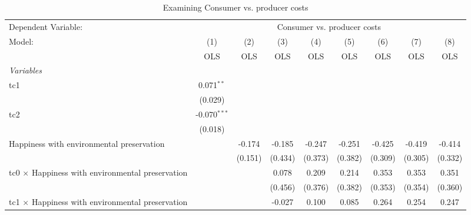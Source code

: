 
\begin{table}[htbp]
   \caption{Examining Consumer vs. producer costs}
   \centering
   \begin{tabular}{lcccccccc}
      \toprule
      Dependent Variable: & \multicolumn{8}{c}{Consumer vs. producer costs}\\
      Model:                                                  & (1)            & (2)     & (3)     & (4)         & (5)         & (6)          & (7)         & (8)\\  
                                                              &  OLS           & OLS     & OLS     & OLS         & OLS         & OLS          & OLS         & OLS\\  
      \midrule
      \emph{Variables}\\
      tc1                                                     & 0.071$^{**}$   &         &         &             &             &              &             &   \\   
                                                              & (0.029)        &         &         &             &             &              &             &   \\   
      tc2                                                     & -0.070$^{***}$ &         &         &             &             &              &             &   \\   
                                                              & (0.018)        &         &         &             &             &              &             &   \\   
      Happiness with environmental preservation               &                & -0.174  & -0.185  & -0.247      & -0.251      & -0.425       & -0.419      & -0.414\\   
                                                              &                & (0.151) & (0.434) & (0.373)     & (0.382)     & (0.309)      & (0.305)     & (0.332)\\   
      tc0 $\times$ Happiness with environmental preservation  &                &         & 0.078   & 0.209       & 0.214       & 0.353        & 0.353       & 0.351\\   
                                                              &                &         & (0.456) & (0.376)     & (0.382)     & (0.353)      & (0.354)     & (0.360)\\   
      tc1 $\times$ Happiness with environmental preservation  &                &         & -0.027  & 0.100       & 0.085       & 0.264        & 0.254       & 0.247\\   

\end{tabular}
\end{table}
